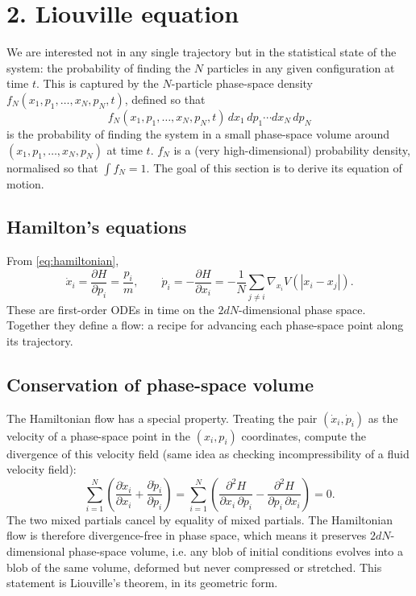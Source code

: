 \documentclass{article}
\begin{document}
\section*{2. Liouville equation}

We are interested not in any single trajectory but in the statistical state of the system: the probability of finding the \(N\) particles in any given configuration at time \(t\). This is captured by the \(N\)-particle phase-space density \(f_N(x_1, p_1, \ldots, x_N, p_N, t)\), defined so that
\[
f_N(x_1, p_1, \ldots, x_N, p_N, t)\, dx_1\, dp_1 \cdots dx_N\, dp_N
\]
is the probability of finding the system in a small phase-space volume around \((x_1, p_1, \ldots, x_N, p_N)\) at time \(t\). \(f_N\) is a (very high-dimensional) probability density, normalised so that \(\int f_N = 1\). The goal of this section is to derive its equation of motion.

\subsection*{Hamilton's equations}
From \eqref{eq:hamiltonian},
\begin{equation}
\dot{x}_i = \frac{\partial H}{\partial p_i} = \frac{p_i}{m}, \qquad
\dot{p}_i = -\frac{\partial H}{\partial x_i} = -\frac{1}{N} \sum_{j \neq i} \nabla_{x_i} V(|x_i - x_j|).
\label{eq:hamilton}
\end{equation}
These are first-order ODEs in time on the \(2dN\)-dimensional phase space. Together they define a flow: a recipe for advancing each phase-space point along its trajectory.

\subsection*{Conservation of phase-space volume}

The Hamiltonian flow has a special property. Treating the pair \((\dot x_i, \dot p_i)\) as the velocity of a phase-space point in the \((x_i, p_i)\) coordinates, compute the divergence of this velocity field (same idea as checking incompressibility of a fluid velocity field):
\[
\sum_{i=1}^N \left( \frac{\partial \dot{x}_i}{\partial x_i} + \frac{\partial \dot{p}_i}{\partial p_i} \right)
= \sum_{i=1}^N \left( \frac{\partial^2 H}{\partial x_i\, \partial p_i} - \frac{\partial^2 H}{\partial p_i\, \partial x_i} \right) = 0.
\]
The two mixed partials cancel by equality of mixed partials. The Hamiltonian flow is therefore divergence-free in phase space, which means it preserves \(2dN\)-dimensional phase-space volume, i.e. any blob of initial conditions evolves into a blob of the same volume, deformed but never compressed or stretched. This statement is Liouville's theorem, in its geometric form.
\end{document}
